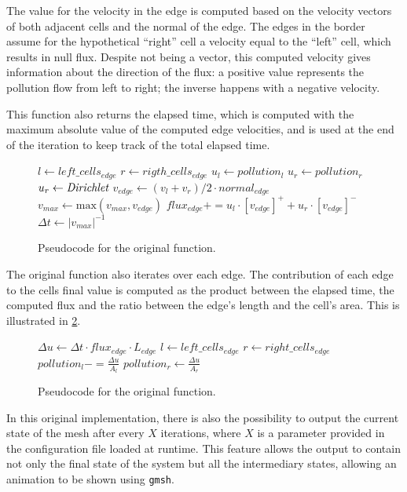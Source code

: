 The value for the velocity in the edge is computed based on the velocity vectors of both adjacent cells and the normal of the edge.
The edges in the border assume for the hypothetical ``right'' cell a velocity equal to the ``left'' cell, which results in null flux.
Despite not being a vector, this computed velocity gives information about the direction of the flux:
a positive value represents the pollution flow from left to right; the inverse happens with a negative velocity.

This function also returns the elapsed time, which is computed with the maximum absolute value of the computed edge velocities, and is used at the end of the iteration to keep track of the total elapsed time.

\begin{figure}[!htp]
	\begin{alg}
			\State $l     \gets left\_cells_{edge}$
			\State $r     \gets rigth\_cells_{edge}$
			\State $u_{l} \gets pollution_{l}$
				\State $u_{r} \gets pollution_{r}$
			\Else
				\State $u_{r} \gets \textit{Dirichlet}$ 
			\EndIf
			\State $v_{edge} \gets (v_{l} + v_{r}) / 2 \cdot normal_{edge}$
			\State $v_{max} \gets \mathrm{max}(v_{max}, v_{edge})$
			\State $flux_{edge} += u_{l} \cdot [v_{edge}]^{+} + u_{r} \cdot [v_{edge}]^{-}$
		\EndFor
		\State $\Delta t \gets |v_{max}|^{-1}$
	\end{alg}

	\caption{Pseudocode for the original \computeflux function.}
	\label{alg:flux}
\end{figure}

The original \update function also iterates over each edge.
The contribution of each edge to the cells final value is computed as the product between the elapsed time, the computed flux and the ratio between the edge's length and the cell's area.
This is illustrated in \cref{alg:update}.

\begin{figure}[!htp]
	\begin{alg}
		\ForAll {$edge \in Edges$}
			\State $\Delta{u} \gets \Delta{t} \cdot flux_{edge} \cdot L_{edge}$
			\State $l \gets left\_cells_{edge}$
			\State $r \gets right\_cells_{edge}$
			\State $pollution_{l} -= \frac{\Delta{u}}{A_{l}}$
			\If {$\exists Cells_{r}$}
				\State $pollution_{r} \gets \frac{\Delta{u}}{A_{r}}$
			\EndIf
		\EndFor
	\end{alg}

	\caption{Pseudocode for the original \update function.}
	\label{alg:update}
\end{figure}

In this original implementation, there is also the possibility to output the current state of the mesh after every $X$ iterations, where $X$ is a parameter provided in the configuration file loaded at runtime.
This feature allows the output to contain not only the final state of the system but all the intermediary states, allowing  an animation to be shown using \texttt{gmsh}.


